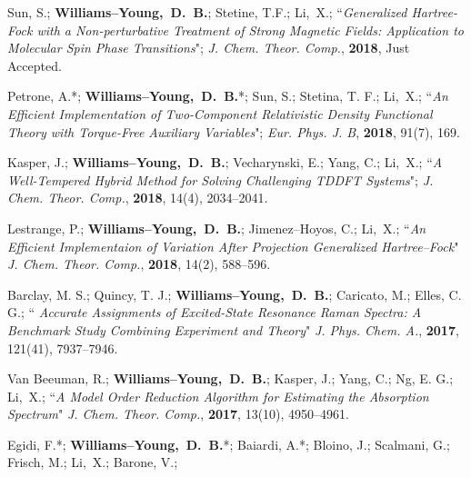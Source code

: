 \documentclass[10pt]{res} %
\newcommand*\me[0]{{\bf Williams--Young,~D.~B.}}
\newcommand*\xsli[0]{Li,~X.}
\begin{document}
\begin{resume}
\vspace{10pt} %
\begin{etaremune}
  \item Sun, S.; \me; Stetine, T.F.; \xsli;
        ``\emph{Generalized Hartree-Fock with a Non-perturbative Treatment 
          of Strong Magnetic Fields: Application to Molecular Spin Phase 
          Transitions}";
        \emph{J. Chem. Theor. Comp.}, \textbf{2018}, Just Accepted.
  \item Petrone, A.*; \me*; Sun, S.; Stetina, T. F.; \xsli;
        ``\emph{An Efficient Implementation of Two-Component Relativistic 
	  Density Functional Theory with Torque-Free Auxiliary Variables}";
	\emph{Eur. Phys. J. B}, \textbf{2018}, 91(7), 169.
  \item Kasper, J.; \me; Vecharynski, E.; Yang, C.; \xsli;
        ``\emph{A Well-Tempered Hybrid Method for Solving Challenging 
	  TDDFT Systems}";
        \emph{J. Chem. Theor. Comp.}, \textbf{2018}, 14(4), 2034--2041.
  \item Lestrange, P.; \me; Jimenez--Hoyos, C.; \xsli;
        ``\emph{An Efficient Implementaion of Variation After Projection 
	  Generalized Hartree--Fock}"
        \emph{J. Chem. Theor. Comp.}, \textbf{2018}, 14(2), 588--596.
  \item Barclay, M. S.; Quincy, T. J.; \me; Caricato, M.; Elles, C. G.;
        ``\emph{ Accurate Assignments of Excited-State Resonance Raman 
                 Spectra: A Benchmark Study Combining Experiment and 
                 Theory}"
        \emph{J. Phys. Chem. A.}, \textbf{2017}, 121(41), 7937--7946.
  \item Van Beeuman, R.; \me; Kasper, J.; Yang, C.; Ng, E. G.; \xsli;
        ``\emph{A Model Order Reduction Algorithm for Estimating the 
	        Absorption Spectrum}"
        \emph{J. Chem. Theor. Comp.}, \textbf{2017}, 13(10), 4950--4961.
  \item Egidi, F.*; \me*; Baiardi, A.*; Bloino, J.; Scalmani, G.; Frisch, M.; 
        \xsli; Barone, V.; 

\end{etaremune}
\end{resume}
\end{document}
